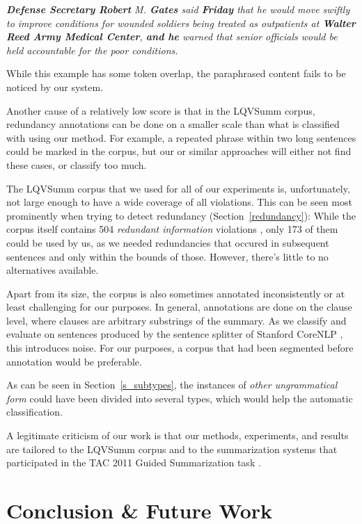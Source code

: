 \documentclass[a4paper,10pt]{scrartcl}
\theoremstyle{style}
\begin{document}
\quad\textit{\textbf{Defense Secretary Robert} M. \textbf{Gates} said \textbf{Friday} that he would move swiftly to improve conditions for wounded soldiers being treated as outpatients at \textbf{Walter Reed Army Medical Center}, \textbf{and he} warned that senior officials would be held accountable for the poor conditions.}

While this example has some token overlap, the paraphrased content fails to be noticed by our system.

Another cause of a relatively low score is that in the LQVSumm corpus, redundancy annotations can be done on a smaller scale than what is classified with using our method. For example, a repeated phrase within two long sentences could be marked in the corpus, but our or similar approaches will either not find these cases, or classify too much.

The LQVSumm corpus that we used for all of our experiments is, unfortunately, not large enough to have a wide coverage of all violations. This can be seen most prominently when trying to detect redundancy (Section~\ref{redundancy}): While the corpus itself contains 504 \textit{redundant information} violations \citep[see][]{friedrichlqvsumm}, only 173 of them could be used by us, as we needed redundancies that occured in subsequent sentences and only within the bounds of those.
However, there's little to no alternatives available.

Apart from its size, the corpus is also sometimes annotated inconsistently or at least challenging for our purposes. In general, annotations are done on the clause level, where clauses are arbitrary substrings of the summary. As we classify and evaluate on sentences produced by the sentence splitter of Stanford CoreNLP \citep{manning-EtAl:2014:P14-5}, this introduces noise. For our purposes, a corpus that had been segmented before annotation would be preferable.

As can be seen in Section~\ref{s_subtypes}, the instances of \textit{other ungrammatical form} could have been divided into several types, which would help the automatic classification.

A legitimate criticism of our work is that our methods, experiments, and results are tailored to the LQVSumm corpus and to the summarization systems that participated in the TAC 2011 Guided Summarization task \citep{owczarzak2011overview}.


\section{Conclusion \& Future Work}
\label{conclusion}
\end{document}

